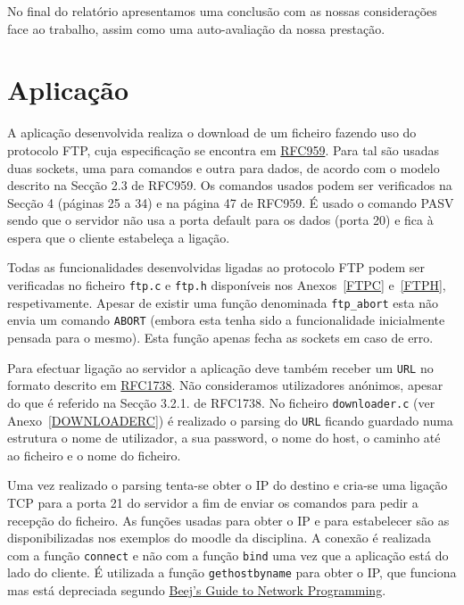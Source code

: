 \documentclass[11pt,a4paper,reqno]{report}
\numberwithin{equation}{section}
\begin{document}
No final do relatório apresentamos uma conclusão com as nossas considerações face ao trabalho, assim como uma auto-avaliação da nossa prestação.


\chapter{Aplicação}

A aplicação desenvolvida realiza o download de um ficheiro fazendo uso do protocolo FTP, cuja especificação se encontra em  \href{https://www.ietf.org/rfc/rfc959.txt}{RFC959}.
Para tal são usadas duas sockets, uma para comandos e outra para dados, de acordo com o modelo descrito na Secção 2.3 de RFC959.
Os comandos usados podem ser verificados na Secção 4 (páginas 25 a 34)  e na página 47 de RFC959. É usado o comando PASV sendo que o servidor não usa a porta default para os dados (porta 20) e fica à espera que o cliente estabeleça a ligação.

Todas as funcionalidades desenvolvidas ligadas ao protocolo FTP podem ser verificadas no ficheiro \verb|ftp.c| e \verb|ftp.h| disponíveis nos Anexos~\ref{FTPC} e~\ref{FTPH}, respetivamente. Apesar de existir uma função denominada \verb|ftp_abort| esta não envia um comando \verb|ABORT| (embora esta tenha sido a funcionalidade inicialmente pensada para o mesmo). Esta função apenas fecha as sockets em caso de erro.

Para efectuar ligação ao servidor a aplicação deve também receber um \verb|URL| no formato descrito em \href{https://www.ietf.org/rfc/rfc1738.txt}{RFC1738}. Não consideramos utilizadores anónimos, apesar do que é referido na Secção 3.2.1. de RFC1738. No ficheiro \verb|downloader.c| (ver Anexo~\ref{DOWNLOADERC}) é realizado o parsing do \verb|URL| ficando guardado numa estrutura o nome de utilizador, a sua password, o nome do host, o caminho até ao ficheiro e o nome do ficheiro.

Uma vez realizado o parsing tenta-se obter o IP do destino e cria-se uma ligação TCP para a porta 21 do servidor a fim de enviar os comandos para pedir a recepção do ficheiro. As funções usadas para obter o IP e para estabelecer são as disponibilizadas nos exemplos do moodle da disciplina. A conexão é realizada com a função \verb|connect| e não com a função \verb|bind| uma vez que a aplicação está do lado do cliente. É utilizada a função \verb|gethostbyname| para obter o IP, que funciona mas está depreciada segundo \href{http://beej.us/guide/bgnet/output/html/multipage/index.html}{Beej's Guide to Network Programming}.
\end{document}
